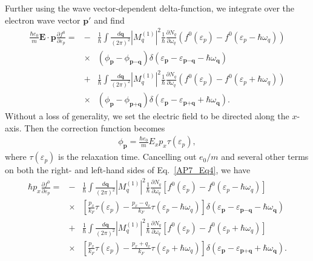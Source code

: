 Further using the wave vector-dependent delta-function, we integrate over the electron wave vector $\textbf{p}'$ and find
%
\begin{eqnarray}
\label{AP7_Eq4}
\frac{\hbar e_0}{m}\textbf{E}\cdot\textbf{p}\frac{\partial f^0}{\partial \varepsilon_p}
=&-&\frac{1}{\hbar}\int\frac{d\textbf{q}}{(2\pi)^2}|M^{(1)}_q|^2\frac{1}{\hbar}\frac{\partial N_q}{\partial \omega_q}
\left(f^0(\varepsilon_p)-f^0(\varepsilon_{p}-\hbar\omega_q)\right)\nonumber \\ \nonumber
&\times& \left(\phi_{\textbf{p}}-\phi_{\textbf{p}-\textbf{q}}\right)
\delta(\varepsilon_{\textbf{p}}-\varepsilon_{\textbf{p}-\textbf{q}}-\hbar\omega_\textbf{q})\\
\nonumber
&+&\frac{1}{\hbar}\int\frac{d\textbf{q}}{(2\pi)^2}|M^{(1)}_q|^2\frac{1}{\hbar}\frac{\partial N_q}{\partial \omega_q}
\left(f^0(\varepsilon_p)-f^0(\varepsilon_{p}+\hbar\omega_q)\right)\\ 
&\times& \left(\phi_{\textbf{p}}-\phi_{\textbf{p}+\textbf{q}}\right)
\delta(\varepsilon_{\textbf{p}}-\varepsilon_{\textbf{p}+\textbf{q}}+\hbar\omega_\textbf{q}).
\end{eqnarray}
%
Without a loss of generality, we set the electric field to be directed along the $x$-axis.
Then the correction function becomes
%
\begin{eqnarray}
\phi_\textbf{p}= \frac{\hbar e_0}{m}E_xp_x\tau(\varepsilon_p),
\end{eqnarray}
%
where $\tau(\varepsilon_p)$ is the relaxation time.
%
Cancelling out $e_0/m$ and several other terms on both the right- and left-hand sides of Eq.~\eqref{AP7_Eq4}, we have
%
\begin{eqnarray}\label{AP7_5}
\hbar p_x\frac{\partial f^0}{\partial \varepsilon_p}
=&-&\frac{1}{\hbar}\int\frac{d\textbf{q}}{(2\pi)^2}|M^{(1)}_q|^2\frac{1}{\hbar}\frac{\partial N_q}{\partial \omega_q}
\left[f^0(\varepsilon_p)-f^0(\varepsilon_{p}-\hbar\omega_q)\right] \\ 
&\times&\left[\frac{p_x}{k_F}\tau(\varepsilon_p)-\frac{p_x-q_x}{k_F}\tau(\varepsilon_p-\hbar\omega_q)\right]
\delta(\varepsilon_{\textbf{p}}-\varepsilon_{\textbf{p}-\textbf{q}}-\hbar\omega_\textbf{q})\nonumber\\
&+&\frac{1}{\hbar}\int\frac{d\textbf{q}}{(2\pi)^2}|M^{(1)}_q|^2\frac{1}{\hbar}\frac{\partial N_q}{\partial \omega_q}
\left[f^0(\varepsilon_p)-f^0(\varepsilon_{p}+\hbar\omega_q)\right] \nonumber\\ 
&\times&\left[\frac{p_x}{k_F}\tau(\varepsilon_p)-\frac{p_x+q_x}{k_F}\tau(\varepsilon_p+\hbar\omega_q)\right]
\delta(\varepsilon_{\textbf{p}}-\varepsilon_{\textbf{p}+\textbf{q}}+\hbar\omega_\textbf{q}).\nonumber
\end{eqnarray}
